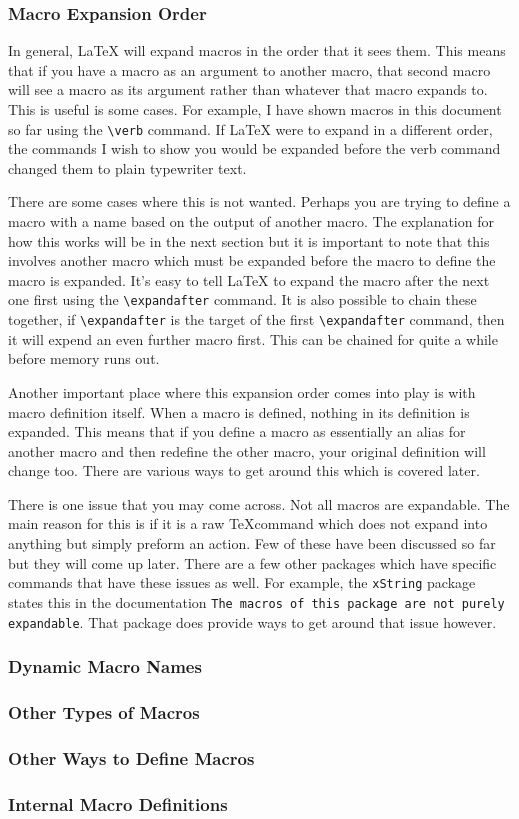 \subsubsection{Macro Expansion Order}
In general, \LaTeX{} will expand macros in the order that it sees them. This means that if you have a macro as an argument to another macro, that second macro will see a macro as its argument rather than whatever that macro expands to. This is useful is some cases. For example, I have shown macros in this document so far using the \verb=\verb= command. If \LaTeX{} were to expand in a different order, the commands I wish to show you would be expanded before the verb command changed them to plain typewriter text. \par
There are some cases where this is not wanted. Perhaps you are trying to define a macro with a name based on the output of another macro. The explanation for how this works will be in the next section but it is important to note that this involves another macro which must be expanded before the macro to define the macro is expanded. It's easy to tell \LaTeX{} to expand the macro after the next one first using the \verb=\expandafter= command. It is also possible to chain these together, if \verb=\expandafter= is the target of the first \verb=\expandafter= command, then it will expend an even further macro first. This can be chained for quite a while before memory runs out. \par
Another important place where this expansion order comes into play is with macro definition itself. When a macro is defined, nothing in its definition is expanded. This means that if you define a macro as essentially an alias for another macro and then redefine the other macro, your original definition will change too. There are various ways to get around this which is covered later. \par
There is one issue that you may come across. Not all macros are expandable. The main reason for this is if it is a raw \TeX command which does not expand into anything but simply preform an action. Few of these have been discussed so far but they will come up later. There are a few other packages which have specific commands that have these issues as well. For example, the \texttt{xString} package states this in the documentation \texttt{The macros of this package are not purely expandable}. That package does provide ways to get around that issue however.
\subsubsection{Dynamic Macro Names}
\subsubsection{Other Types of Macros}
\subsubsection{Other Ways to Define Macros} \label{section:programming/macros/otherWays}
\subsubsection{Internal Macro Definitions}